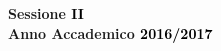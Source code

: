\documentclass[12pt,a4paper]{report}
\begin{document}
\begin{titlepage}
\vspace{12mm}

\begin{center}
%
%
{\large{\bf Sessione \textcolor{black}{II}
\vspace{2mm}\\
%
%
Anno Accademico \textcolor{black}{ 2016/2017}}}
\end{center}

%

\end{titlepage}
\end{document}
